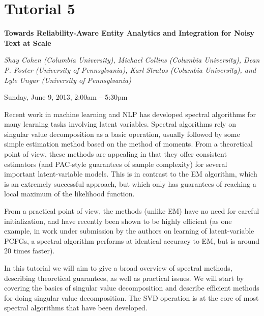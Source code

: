 \section%
    [\textbf{T5:}  Spectral Learning Algorithms for Natural Language Processing (S. Cohen, M. Collins, D.~P. Foster, K. Stratos and L. Ungar)]
    {Tutorial 5}
\label{TutE}
\begin{center}
\begin{Large}
\bfseries Towards Reliability-Aware Entity Analytics and Integration for Noisy Text at Scale\\ \vspace{2em}\par
\end{Large}

{\itshape Shay Cohen (Columbia University), Michael Collins (Columbia University), Dean P. Foster (University of Pennsylvania), Karl Stratos (Columbia University), and Lyle Ungar (University of Pennsylvania)}\vspace{1em}\par
Sunday, June 9, 2013, 2:00am -- 5:30pm \vspace{1em}\\
\TutLocE
\end{center}

\noindent
Recent work in machine learning and NLP has developed spectral algorithms for many learning tasks involving latent variables. Spectral algorithms rely on singular value decomposition as a basic operation, usually followed by some simple estimation method based on the method of moments. From a theoretical point of view, these methods are appealing in that they offer consistent estimators (and PAC-style guarantees of sample complexity) for several important latent-variable models. This is in contrast to the EM algorithm, which is an extremely successful approach, but which only has guarantees of reaching a local maximum of the likelihood function.

From a practical point of view, the methods (unlike EM) have no need for careful initialization, and have recently been shown to be highly efficient (as one example, in work under submission by the authors on learning of latent-variable PCFGs, a spectral algorithm performs at identical accuracy to EM, but is around 20 times faster).

In this tutorial we will aim to give a broad overview of spectral methods, describing theoretical guarantees, as well as practical issues. We will start by covering the basics of singular value decomposition and describe efficient methods for doing singular value decomposition. The SVD operation is at the core of most spectral algorithms that have been developed.

